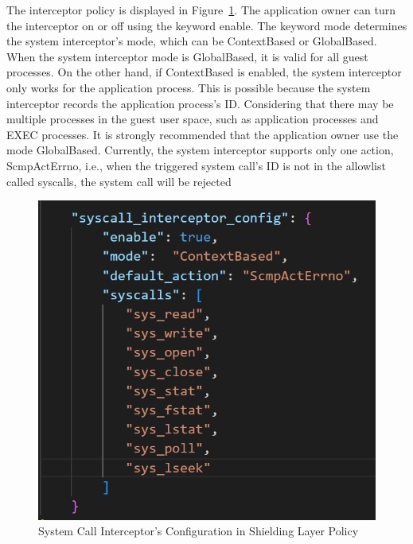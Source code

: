 The interceptor policy is displayed in Figure~\ref{fig:policy_system_call}. The application owner can turn the interceptor on or off using the keyword enable. The keyword mode determines the system interceptor's mode, which can be ContextBased or GlobalBased. When the system 
interceptor mode is GlobalBased, it is valid for all guest processes. On the other hand, if ContextBased is enabled, the system interceptor only works for the application process. This is possible because the system interceptor records the 
application process's ID. Considering that there may be multiple processes in the guest user space, such as application processes and EXEC processes. It is strongly recommended that the application owner use the mode GlobalBased. Currently, the 
system interceptor supports only one action, ScmpActErrno, i.e., when the triggered system call's ID is not in the allowlist called syscalls, the system call will be rejected
\begin{figure}[H]
    \centering
    \includegraphics[scale=0.3]{images/policy_system_call.png}
    \caption[System Call Interceptor's Configuration in Shielding Layer Policy]{System Call Interceptor's Configuration in Shielding Layer Policy}
    \label{fig:policy_system_call}
\end{figure}

